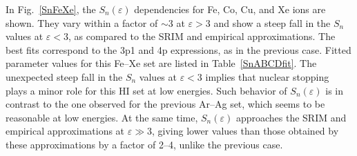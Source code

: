 \documentclass[aps,pra,twocolumn,amsmath,amssymb,floatfix]{revtex4-2}
\begin{document}
In Fig.~\ref{SnFeXe}, the $S_{n}(\varepsilon)$ dependencies for Fe, Co, Cu, and Xe ions are shown. They vary within a factor of $\sim$3 at $\varepsilon > 3$ and show a steep fall in the $S_{n}$ values at $\varepsilon < 3$, as compared to the SRIM and empirical approximations. The best fits correspond to the 3p1 and 4p expressions, as in the previous case. Fitted parameter values for this Fe--Xe set are listed in Table~\ref{SnABCDfit}. The unexpected steep fall in the $S_{n}$ values at $\varepsilon < 3$ implies that nuclear stopping plays a minor role for this HI set at low energies. Such behavior of $S_{n}(\varepsilon)$ is in contrast to the one observed for the previous Ar--Ag set, which seems to be reasonable at low energies. At the same time, $S_{n}(\varepsilon)$ approaches the SRIM and empirical approximations at $\varepsilon \gg 3$, giving lower values than those obtained by these approximations by a factor of 2--4, unlike the previous case.
\end{document}
